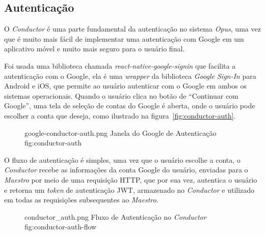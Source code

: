 \subsection{Autenticação}

O \emph{Conductor} é uma parte fundamental da autenticação no sistema \emph{Opus}, uma vez que é muito mais fácil de implementar uma autenticação com Google
em um aplicativo móvel e muito mais seguro para o usuário final.

Foi usada uma biblioteca chamada \emph{react-native-google-signin} que facilita a autenticação com o Google, ela é uma \emph{wrapper} da biblioteca
\emph{Google Sign-In} para Android e iOS, que permite ao usuário autenticar com o Google em ambos os sistemas operacionais. Quando o usuário
clica no botão de ``Continuar com Google'', uma tela de seleção de contas do Google é aberta, onde o usuário pode escolher a conta que deseja,
como ilustrado na figura~\ref{fig:conductor-auth}.

\begin{figure}[ht]
    {google-conductor-auth.png}
    {Janela do Google de Autenticação}
    {fig:conductor-auth}
\end{figure}

O fluxo de autenticação é simples, uma vez que o usuário escolhe a conta, o \emph{Conductor} recebe as informações da conta Google do usuário, enviadas 
para o \emph{Maestro} por meio de uma requisição HTTP, que por sua vez, autentica o usuário e retorna um \emph{token} de autenticação JWT, 
armazenado no \emph{Conductor} e utilizado em todas as requisições subsequentes ao \emph{Maestro}.

\begin{figure}[ht]
    {conductor_auth.png}
    {Fluxo de Autenticação no \emph{Conductor}}
    {fig:conductor-auth-flow}
\end{figure}